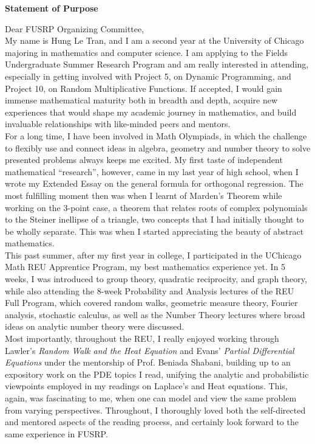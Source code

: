 \documentclass[a4paper, 11pt]{extarticle}
\begin{document}
\pagestyle{empty}
\begin{center}
    \textbf{\Large{Statement of Purpose}}
\end{center}

Dear FUSRP Organizing Committee,\\

My name is Hung Le Tran, and I am a second year at the University of Chicago majoring in mathematics and computer science. I am applying to the Fields Undergraduate Summer Research Program and am really interested in attending, especially in getting involved with Project 5, on Dynamic Programming, and Project 10, on Random Multiplicative Functions. If accepted, I would gain immense mathematical maturity both in breadth and depth, acquire new experiences that would shape my academic journey in mathematics, and build invaluable relationships with like-minded peers and mentors.\\

For a long time, I have been involved in Math Olympiads, in which the challenge to flexibly use and connect ideas in algebra, geometry and number theory to solve presented problems always keeps me excited. My first taste of independent mathematical “research”, however, came in my last year of high school, when I wrote my Extended Essay on the general formula for orthogonal regression. The most fulfilling moment then was when I learnt of Marden's Theorem while working on the 3-point case, a theorem that relates roots of complex polynomials to the Steiner inellipse of a triangle, two concepts that I had initially thought to be wholly separate. This was when I started appreciating the beauty of abstract mathematics.\\

This past summer, after my first year in college, I participated in the UChicago Math REU Apprentice Program, my best mathematics experience yet. In 5 weeks, I was introduced to group theory, quadratic reciprocity, and graph theory, while also attending the 8-week Probability and Analysis lectures of the REU Full Program, which covered random walks, geometric measure theory, Fourier analysis, stochastic calculus, as well as the Number Theory lectures where broad ideas on analytic number theory were discussed.\\

Most importantly, throughout the REU, I really enjoyed working through Lawler's \textit{Random Walk and the Heat Equation} and Evans' \textit{Partial Differential Equations} under the mentorship of Prof. Beniada Shabani, building up to an expository work on the PDE topics I read, unifying the analytic and probabilistic viewpoints employed in my readings on Laplace's and Heat equations. This, again, was fascinating to me, when one can model and view the same problem from varying perspectives. Throughout, I thoroughly loved both the self-directed and mentored aspects of the reading process, and certainly look forward to the same experience in FUSRP.\\
\end{document}
